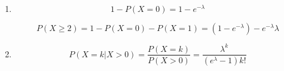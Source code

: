 \begin{enumerate}[label=(\alph*)]
\item $$1 - P(X = 0) = 1 - e^{-\lambda}$$

$$P(X \geq 2) = 1 - P(X = 0) - P(X = 1) = (1 - e^{-\lambda}) - e^
{-\lambda}\lambda$$

\item $$P(X = k | X > 0) = \frac{P(X = k)}{P(X > 0)} = \frac{\lambda^{k}}{(e^
{\lambda} - 1)k!}$$

\end{enumerate}